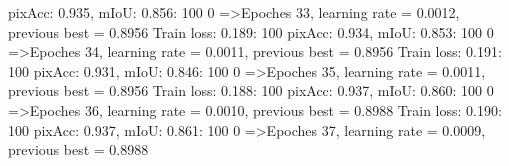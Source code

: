 pixAcc: 0.935, mIoU: 0.856: 100%
  0%
=>Epoches 33, learning rate = 0.0012,                 previous best = 0.8956
Train loss: 0.189: 100%
pixAcc: 0.934, mIoU: 0.853: 100%
  0%
=>Epoches 34, learning rate = 0.0011,                 previous best = 0.8956
Train loss: 0.191: 100%
pixAcc: 0.931, mIoU: 0.846: 100%
  0%
=>Epoches 35, learning rate = 0.0011,                 previous best = 0.8956
Train loss: 0.188: 100%
pixAcc: 0.937, mIoU: 0.860: 100%
  0%
=>Epoches 36, learning rate = 0.0010,                 previous best = 0.8988
Train loss: 0.190: 100%
pixAcc: 0.937, mIoU: 0.861: 100%
  0%
=>Epoches 37, learning rate = 0.0009,                 previous best = 0.8988
